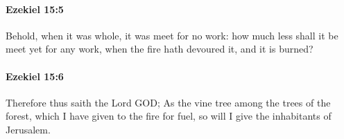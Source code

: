 		\paragraph{Ezekiel 15:5} %
			\label{EZEKIEL-15-5}

			Behold, when it was whole, it was meet for no work: how much less shall it be meet yet for any work, when the fire hath devoured it, and it is burned?


		\paragraph{Ezekiel 15:6} %
			\label{EZEKIEL-15-6}

			Therefore thus saith the Lord GOD; As the vine tree among the trees of the forest, which I have given to the fire for fuel, so will I give the inhabitants of Jerusalem.


